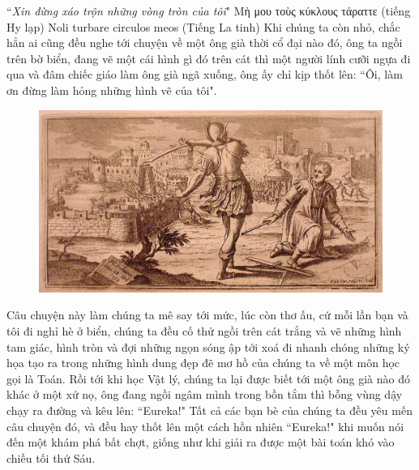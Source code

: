 \begin{multicols}{2}
	``\textit{Xin đừng xáo trộn những vòng tròn của tôi}"
	\vskip 0.1cm
	\hfill Μὴ μου τοὺς κύκλους τάραττε (tiếng Hy lạp)
	\vskip 0.1cm
	\hfill Noli turbare circulos meos (Tiếng La tinh)
	\vskip 0.1cm
	Khi chúng ta còn nhỏ, chắc hẳn ai cũng đều nghe tới chuyện về một ông già thời cổ đại nào đó, ông ta ngồi trên bờ biển, đang vẽ một cái hình gì đó trên cát thì một người lính cưỡi ngựa đi qua và đâm chiếc giáo làm ông già ngã xuống, ông ấy chỉ kịp thốt lên: ``Ôi, làm ơn đừng làm hỏng những hình vẽ của tôi".
	\begin{figure}[H]
		\vspace*{-5pt}
		\centering
		\captionsetup{labelformat= empty, justification=centering}
		\includegraphics[width= 1\linewidth]{1}
		\vspace*{-20pt}
	\end{figure}
	Câu chuyện này làm chúng ta mê say tới mức, lúc còn thơ ấu, cứ mỗi lần bạn và tôi đi nghỉ hè ở biển, chúng ta đều cố thử ngồi trên cát trắng và vẽ những hình tam giác, hình tròn và đợi những ngọn sóng ập tới xoá đi nhanh chóng những ký họa tạo ra trong những hình dung đẹp đẽ mơ hồ của chúng ta về một môn học gọi là Toán.
	\vskip 0.1cm
	Rồi tới khi học Vật lý, chúng ta lại được biết tới một ông già nào đó khác ở một xứ nọ, ông đang ngồi ngâm mình trong bồn tắm thì bỗng vùng dậy chạy ra đường và kêu lên: ``Eureka!" Tất cả các bạn bè của chúng ta đều yêu mến câu chuyện đó, và đều hay thốt lên một cách hồn nhiên ``Eureka!" khi muốn nói đến một khám phá bất chợt, giống như khi giải ra được một bài toán khó vào chiều tối thứ Sáu.
	\vskip 0.1cm

\end{multicols}
